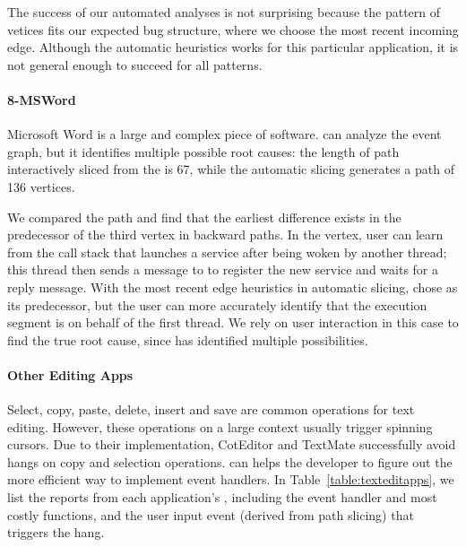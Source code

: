The success of our automated analyses 
is not surprising because the pattern of vetices fits our expected bug structure,
where we choose the most recent incoming edge.
Although the automatic heuristics works for this particular application, it is
not general enough to succeed for all patterns.

\paragraph{8-MSWord}

Microsoft Word is a large and complex piece of software. \xxx can analyze the
event graph, but it identifies multiple possible root causes: the length of path
interactively sliced from the \spinningnode is 67, while the automatic slicing
generates a path of 136 vertices.


We compared the path and find that the earliest difference exists in the
predecessor of the third vertex in backward paths. In the vertex, user
can learn from the call stack that  launches a service
 after being woken by another
 thread; this thread then sends a message to 
to register the new service and waits for a reply message. With the most
recent edge heuristics in automatic slicing, \xxx chose  as its
predecessor, but the user can more accurately identify that the execution segment
is on behalf of the first thread. We rely on user interaction in this case
to find the true root cause, since \xxx has identified multiple
possibilities.

\paragraph{Other Editing Apps}

Select, copy, paste, delete, insert and save are common operations for text
editing. However, these operations on a large context usually trigger spinning
cursors. Due to their implementation, CotEditor and TextMate successfully
avoid hangs on copy and selection operations. \xxx can helps the developer
to figure out the more efficient way to implement event handlers. In
Table~\ref{table:texteditapps}, we list the reports from each application's
\spinningnode, including the event handler and most costly functions, and the
user input event (derived from path slicing) that triggers the hang.

